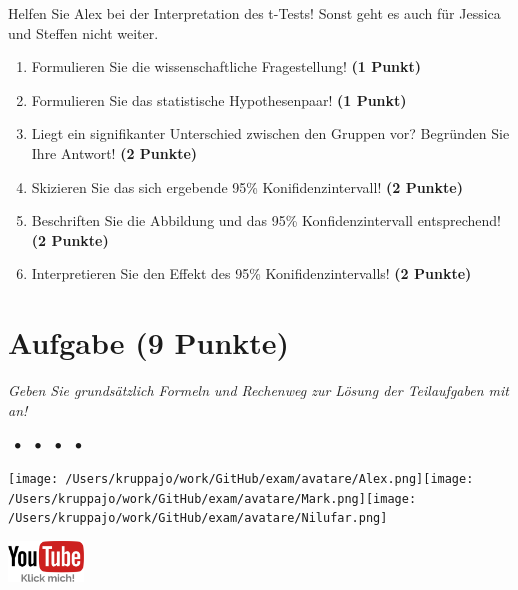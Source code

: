 \documentclass[a4paper, 9pt]{scrartcl}\usepackage[]{graphicx}\usepackage[]{xcolor}
\begin{document}
Helfen Sie Alex bei der Interpretation des t-Tests! Sonst geht es auch für Jessica und Steffen nicht weiter.

\begin{enumerate}
  \item Formulieren Sie die wissenschaftliche Fragestellung! \textbf{(1 Punkt)}
  \item Formulieren Sie das statistische Hypothesenpaar! \textbf{(1 Punkt)}
\item Liegt ein signifikanter Unterschied zwischen den Gruppen vor? Begründen Sie Ihre Antwort! \textbf{(2 Punkte)}
\item Skizieren Sie das sich ergebende 95\% Konifidenzintervall! \textbf{(2 Punkte)}
\item Beschriften Sie die Abbildung und das 95\% Konfidenzintervall entsprechend! \textbf{(2 Punkte)}  
\item Interpretieren Sie den Effekt des 95\% Konifidenzintervalls! \textbf{(2 Punkte)}
\end{enumerate} 
\clearpage

\section{Aufgabe \hfill (9 Punkte)}

\textit{Geben Sie grundsätzlich Formeln und Rechenweg zur Lösung der Teilaufgaben mit an!} \\[1Ex]
 

 
\ifcollection
\begin{flushright}
\tiny\vspace{-3Ex}
\textbf{\examinhaltstart}
\exammodulemathstat $\;\bullet$
\exammodulestat $\;\bullet$
\exammodulestatbbv $\;\bullet$
\exammodulestatversuch $\;\bullet$
\exammodulebiostat
\vspace{-4Ex}
\end{flushright}
\begin{minipage}[t]{0.5\textwidth}
\texttt{[image: /Users/kruppajo/work/GitHub/exam/avatare/Alex.png]}\hspace{-4mm}\texttt{[image: /Users/kruppajo/work/GitHub/exam/avatare/Mark.png]}\hspace{-4mm}\texttt{[image: /Users/kruppajo/work/GitHub/exam/avatare/Nilufar.png]}
\end{minipage}
\begin{minipage}[t]{0.5\textwidth}
\hfill
\href{https://youtu.be/w62HJlbN28U}{\includegraphics[width = 2cm]{img/youtube}}
\end{minipage}
\fi
\end{document}
